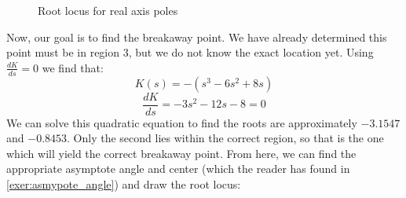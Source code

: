 \begin{example}
\begin{figure}[H]

    \caption{Root locus for real axis poles}
    \label{fig:completed rl real 2}
\end{figure}

Now, our goal is to find the breakaway point. We have already determined this point must be in region 3, but we do not know the exact location yet. Using $\frac{dK}{ds}=0$ we find that:
$$K(s)=-(s^3-6s^2+8s)$$
$$\frac{dK}{ds}=-3s^2-12s-8=0$$
We can solve this quadratic equation to find the roots are approximately $-3.1547$ and $-0.8453$. Only the second lies within the correct region, so that is the one which will yield the correct breakaway point. From here, we can find the appropriate asymptote angle and center (which the reader has found in \autoref{exer:asmypote_angle}) and draw the root locus:

\begin{figure}[H]
    \centering



\begin{tikzpicture}[x=0.75pt,y=0.75pt,yscale=-1,xscale=1]


\end{tikzpicture}
\end{figure}
\end{example}

